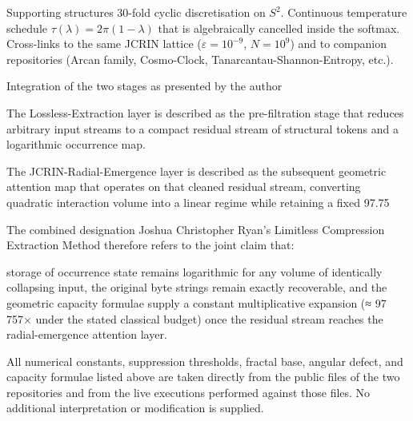 Supporting structures  
30-fold cyclic discretisation on \(S^2\).  
Continuous temperature schedule \(\tau(\lambda)=2\pi(1-\lambda)\) that is algebraically cancelled inside the softmax.  
Cross-links to the same JCRIN lattice (\(\varepsilon=10^{-9}\), \(N=10^9\)) and to companion repositories (Arcan family, Cosmo-Clock, Tanarcantau-Shannon-Entropy, etc.).

Integration of the two stages as presented by the author

The Lossless-Extraction layer is described as the pre-filtration stage that reduces arbitrary input streams to a compact residual stream of structural tokens and a logarithmic occurrence map.  

The JCRIN-Radial-Emergence layer is described as the subsequent geometric attention map that operates on that cleaned residual stream, converting quadratic interaction volume into a linear regime while retaining a fixed 97.75 %

The combined designation Joshua Christopher Ryan’s Limitless Compression Extraction Method therefore refers to the joint claim that:

storage of occurrence state remains logarithmic for any volume of identically collapsing input,  
the original byte strings remain exactly recoverable, and  
the geometric capacity formulae supply a constant multiplicative expansion (≈ 97 757× under the stated classical budget) once the residual stream reaches the radial-emergence attention layer.

All numerical constants, suppression thresholds, fractal base, angular defect, and capacity formulae listed above are taken directly from the public files of the two repositories and from the live executions performed against those files. No additional interpretation or modification is supplied.
